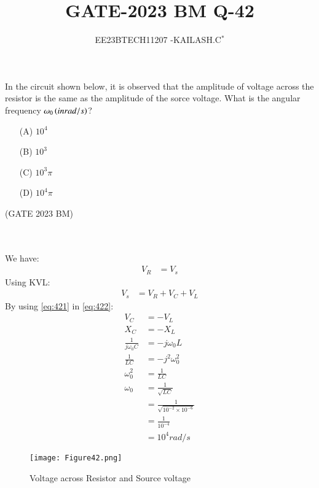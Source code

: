 \documentclass[journal,12pt,twocolumn]{IEEEtran}
\theoremstyle{remark}
\begin{document}

\vspace{3cm}

\title{GATE-2023 BM Q-42}
\author{EE23BTECH11207 -KAILASH.C$^{*}$%
}
\maketitle
\newpage
\bigskip

\renewcommand{\thefigure}{\theenumi}
\renewcommand{\thetable}{\theenumi}
In the circuit shown below, it is observed that the amplitude of voltage across the resistor is the same as the amplitude of the sorce voltage. What is the angular frequency $\omega_0\left(in rad/s\right)$?

\begin{enumerate}
    \item[(A)] $10^4$\\
    \item[(B)] $10^3$\\
    \item[(C)] $10^3\pi$\\
    \item[(D)] $10^4\pi$  
\end{enumerate} \hfill(GATE 2023 BM)
\solution
\fi

\\

\\
We have:
\begin{align}
    V_R&=V_s \label{eq:421}
\end{align}
Using KVL:
\begin{align}
    V_s&=V_R+V_C+V_L\label{eq:422}
\end{align}
By using \eqref{eq:421} in \eqref{eq:422}:
\begin{align}
    V_C&=-V_L\label{eq:423}\\
    X_C&=-X_L\label{eq:424}\\
    \frac{1}{j\omega_0C}&=-j\omega_0L\label{eq:425}\\
\frac{1}{LC} &= -j^2\omega_0^{2} \label{eq:426}\\ 
\omega_0^{2}&=\frac{1}{LC}\label{eq:427}\\
\omega_0&=\frac{1}{\sqrt{LC}} \label{eq:428}\\
&=\frac{1}{\sqrt{10^{-2}\times10^{-6}}}\label{eq:429}\\
&=\frac{1}{10^{-4}}\label{eq:4210}\\
&=10^4 rad/s\label{eq:4211}
\end{align}
\begin{figure}[h]
        \centering
\texttt{[image: Figure42.png]}
    \caption{Voltage across Resistor and Source voltage}
    \label{fig:plot42}
\end{figure}
\end{document}
